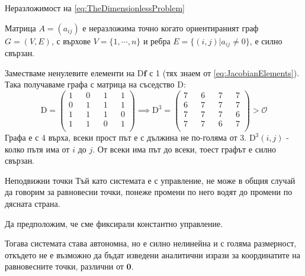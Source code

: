   \begin{frame}[t]{Неразложимост на \ref{eq:TheDimensionlessProblem}}
  \begin{theorem}
  \label{theorem:ConnectedIrreducability}
  Матрица $A=(a_{ij})$ е неразложима точно когато ориентираният граф $G=(V,E)$, с върхове $V=\{1, \cdots, n\}$ и ребра $E=\{(i,j) \vert a_{ij} \neq 0 \}$, е силно свързан.
  \end{theorem}

  Заместваме ненулевите елементи на $\mathrm{D} \boldsymbol{f}$ с 1 (тях знаем от \ref{eq:JacobianElements}). Така получаваме графа с матрица на съседство $\mathrm{D}$:
  \begin{equation*}
    \mathrm{D} =
    \begin{pmatrix}
      1 && 0 && 1 && 1 \\
      0 && 1 && 1 && 1 \\
      1 && 1 && 1 && 0 \\
      1 && 1 && 0 && 1 \\
    \end{pmatrix}
    \implies
    \mathrm{D}^3 =
    \begin{pmatrix}
      7 && 6 && 7 && 7 \\
      6 && 7 && 7 && 7 \\
      7 && 7 && 7 && 6 \\
      7 && 7 && 6 && 7 \\
    \end{pmatrix}
    >
    \mathscr{O}
  \end{equation*}
  Графа е с 4 върха, всеки прост път е с дължина не по-голяма от 3.
  $\mathrm{D}^3(i,j)$ - колко пътя има от $i$ до $j$.
  От всеки има път до всеки, тоест графът е силно свързан.
  \end{frame}

\begin{frame}[t]{Неподвижни точки}
Тъй като системата е с управление, не може в общия случай да говорим за равновесни точки, понеже промени по него водят до промени по дясната страна.

Да предположим, че сме фиксирали константно управление.

Тогава системата става автономна, но е силно нелинейна и с голяма размерност, откъдето не е възможно да бъдат изведени аналитични изрази за координатите на равновесните точки, различни от $\boldsymbol{0}$.
\end{frame}

